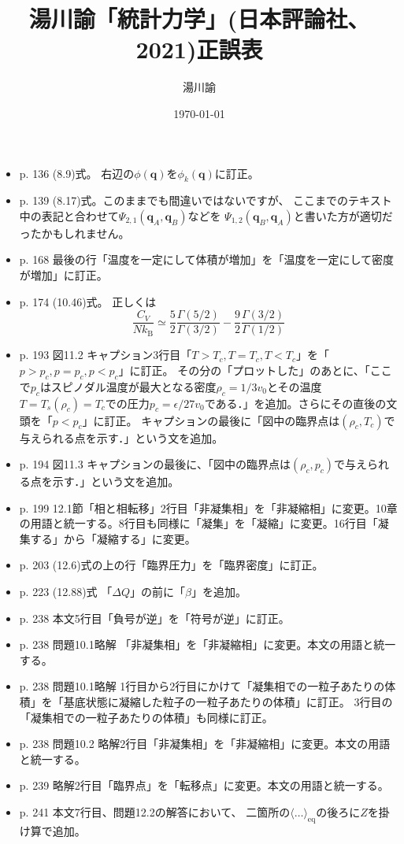 \documentclass[dvipdfmx,uplatex]{jsarticle}
\begin{document}
\title{湯川諭「統計力学」(日本評論社、2021)正誤表}
\author{湯川諭}
\date{\today}
\maketitle
\begin{itemize}
\item
p. 136 (8.9)式。
右辺の$\phi(\boldsymbol{q})$を$\phi_{k}(\boldsymbol{q})$に訂正。
\item
p. 139 (8.17)式。このままでも間違いではないですが、
ここまでのテキスト中の表記と合わせて$\Psi_{2,1}(\boldsymbol{q}_{A}, \boldsymbol{q}_{B})$などを
$\Psi_{1,2}(\boldsymbol{q}_{B}, \boldsymbol{q}_{A})$と書いた方が適切だったかもしれません。
\item
p. 168 最後の行「温度を一定にして体積が増加」を「温度を一定にして密度が増加」に訂正。
\item
p. 174 (10.46)式。
正しくは
\[
 \dfrac{C_V}{N k_\mathrm{B}}\simeq
 \dfrac{5}{2} \dfrac{\Gamma(5/2)}{\Gamma(3/2)} -
 \dfrac{9}{2} \dfrac{\Gamma(3/2)}{\Gamma(1/2)}
\]
\item 
p. 193 図11.2 キャプション3行目「$T>T_{c}, T=T_{c}, T<T_{c}$」を「$p>p_{c},p=p_{c},p<p_{c}$」に訂正。
その分の「プロットした」のあとに、「ここで$p_{c}$はスピノダル温度が最大となる密度$\rho_c = 1\slash 3v_{0}$とその温度$T=T_s(\rho_{c})=T_{c}$での圧力$p_{c} = \epsilon\slash 27 v_{0}$である．」を追加。さらにその直後の文頭を「$p<p_{c}$」に訂正。
キャプションの最後に「図中の臨界点は$(\rho_{c}, T_{c})$で与えられる点を示す．」という文を追加。
\item 
p. 194 図11.3 キャプションの最後に、「図中の臨界点は$(\rho_{c}, p_{c})$で与えられる点を示す．」という文を追加。
\item
p. 199 12.1節「相と相転移」2行目「非凝集相」を「非凝縮相」に変更。10章の用語と統一する。8行目も同様に「凝集」を「凝縮」に変更。16行目「凝集する」から「凝縮する」に変更。
\item
p. 203 (12.6)式の上の行「臨界圧力」を「臨界密度」に訂正。
\item
p. 223 (12.88)式 「$\Delta Q$」の前に「$\beta$」を追加。
\item
p. 238 本文5行目「負号が逆」を「符号が逆」に訂正。
\item 
p. 238 問題10.1略解 「非凝集相」を「非凝縮相」に変更。本文の用語と統一する。
\item
p. 238 問題10.1略解 1行目から2行目にかけて「凝集相での一粒子あたりの体積」を「基底状態に凝縮した粒子の一粒子あたりの体積」に訂正。
3行目の「凝集相での一粒子あたりの体積」も同様に訂正。
\item
p. 238 問題10.2 略解2行目「非凝集相」を「非凝縮相」に変更。本文の用語と統一する。
\item
p. 239 略解2行目「臨界点」を「転移点」に変更。本文の用語と統一する。
\item
p. 241 本文7行目、問題12.2の解答において、 二箇所の$\langle \dots \rangle_{\mathrm{eq}}$の後ろに$Z$を掛け算で追加。
\end{itemize}
\end{document}
